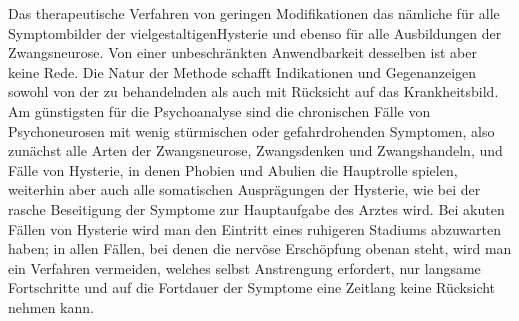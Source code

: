 \documentclass[twoside=true,titlepage=false,open=any, parskip=never, fontsize=10pt, headings=small, chapterprefix=false, appendixprefix=false]{scrbook}
\begin{document}
            
        \pstart
        Das therapeutische Verfahren  von geringen Modifikationen
                das nämliche für alle Symptombilder der vielgestaltigenHysterie und ebenso für alle Ausbildungen der Zwangsneurose. Von einer unbeschränkten
               Anwendbarkeit desselben ist aber keine Rede. Die Natur der  Methode schafft Indikationen und Gegenanzeigen sowohl von  der zu behandelnden  als auch mit Rücksicht auf das Krankheitsbild. Am günstigsten für die
               Psychoanalyse sind die chronischen Fälle von Psychoneurosen mit wenig
               stürmischen oder gefahrdrohenden Symptomen, also zunächst alle Arten der
               Zwangsneurose, Zwangsdenken und Zwangshandeln, und Fälle von Hysterie, in
               denen Phobien und Abulien  die Hauptrolle spielen, weiterhin aber auch alle
               somatischen Ausprägungen der Hysterie, 
                wie bei der  rasche Beseitigung der Symptome zur Hauptaufgabe des Arztes wird. Bei
               akuten Fällen von Hysterie wird man den Eintritt eines ruhigeren Stadiums
               abzuwarten haben; in allen Fällen, bei denen die nervöse Erschöpfung obenan
               steht, wird man ein Verfahren vermeiden, welches selbst Anstrengung erfordert,
               nur langsame Fortschritte  und auf die Fortdauer der Symptome eine Zeitlang keine Rücksicht nehmen
                  kann.
        \pend
    
\end{document}
